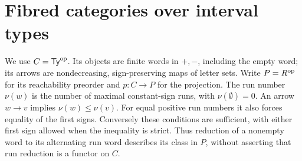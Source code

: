 \section{Fibred categories over interval types}
\label{sec:B}

We use $C=\mathsf{Ty}^{\mathrm{op}}$. Its objects are finite words in $+,-$, including
the empty word; its arrows are nondecreasing, sign-preserving maps of
letter sets. Write $P=R^{\mathrm{op}}$ for its reachability preorder and
$p:C\to P$ for the projection. The run number $\nu(w)$ is the number
of maximal constant-sign runs, with $\nu(\emptyset)=0$. An arrow
$w\to v$ implies $\nu(w)\leq\nu(v)$. For equal positive run numbers
it also forces equality of the first signs. Conversely these conditions
are sufficient, with either first sign allowed when the inequality is
strict. Thus reduction of a nonempty word to its alternating run word
describes its class in $P$, without asserting that run reduction is a
functor on $C$.

